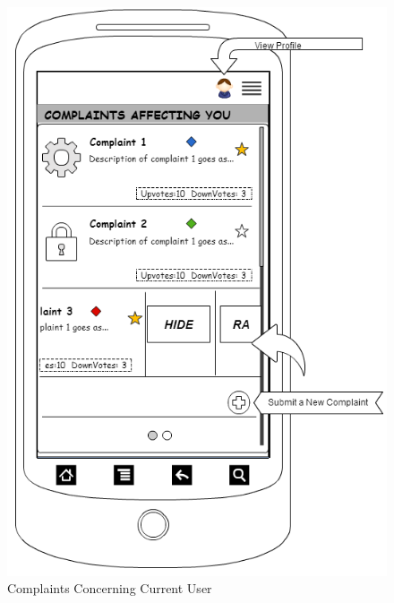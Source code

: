\documentclass[12pt]{article}
\begin{document}
    \begin{figure}[!ht]
      \begin{minipage}{.5\textwidth}
        \centering
        \includegraphics[width=1.1\textwidth]{./appMockUp/complaintsAffectingYouScreen}
        \caption{Complaints Concerning Current User}
        \label{fig:complaintsAffectingYouScreen}
      \end{minipage}
      \begin{minipage}{.49\textwidth}
        \centering

\end{minipage}
\end{figure}
\end{document}
